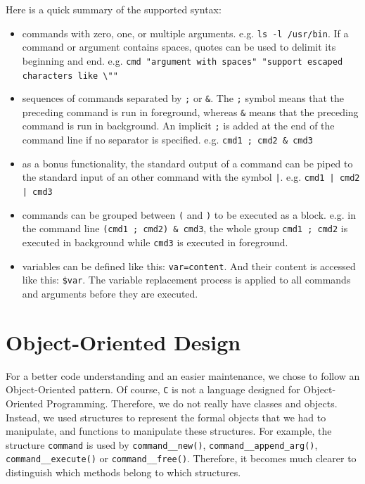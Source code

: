 \documentclass[fleqn]{article}
\begin{document}
Here is a quick summary of the supported syntax:
\begin{itemize}
    \item commands with zero, one, or multiple arguments. e.g. \texttt{ls -l /usr/bin}. If a command or argument contains spaces, quotes can be used to delimit its beginning and end. e.g. \texttt{cmd "argument with spaces" "support escaped characters like \textbackslash""}
    \item sequences of commands separated by \texttt{;} or \texttt{\&}. The \texttt{;} symbol means that the preceding command is run in foreground, whereas \texttt{\&} means that the preceding command is run in background. An implicit \texttt{;} is added at the end of the command line if no separator is specified. e.g. \texttt{cmd1 ; cmd2 \& cmd3}
    \item as a bonus functionality, the standard output of a command can be piped to the standard input of an other command with the symbol \texttt{|}. e.g. \texttt{cmd1 | cmd2 | cmd3}
    \item commands can be grouped between \texttt{(} and \texttt{)} to be executed as a block. e.g. in the command line \texttt{(cmd1 ; cmd2) \& cmd3}, the whole group \texttt{cmd1 ; cmd2} is executed in background while \texttt{cmd3} is executed in foreground.
    \item variables can be defined like this: \texttt{var=content}. And their content is accessed like this: \texttt{\$var}. The variable replacement process is applied to all commands and arguments before they are executed.
\end{itemize}

\section{Object-Oriented Design}
\label{sec:oop}

For a better code understanding and an easier maintenance, we chose to follow an Object-Oriented pattern. Of course, \texttt{C} is not a language designed for Object-Oriented Programming. Therefore, we do not really have classes and objects. Instead, we used structures to represent the formal objects that we had to manipulate, and functions to manipulate these structures. For example, the structure \texttt{command} is used by \texttt{command\_\_new()}, \texttt{command\_\_append\_arg()}, \texttt{command\_\_execute()} or \texttt{command\_\_free()}. Therefore, it becomes much clearer to distinguish which methods belong to which structures.
\end{document}
